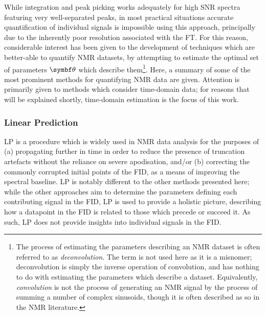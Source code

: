 While integration and peak picking works adequately for high \ac{SNR} spectra
featuring very well-separated peaks, in most practical situations accurate
quantification of individual signals is impossible using this approach,
principally due to the inherently poor resolution associated with the
\ac{FT}.
For this reason, considerable interest has been given to the development of
techniques which are better-able to quantify \ac{NMR} datasets, by attempting
to estimate the optimal set of parameters $\bth$ which describe them\footnote{
    The process of estimating the parameters describing an \ac{NMR}
    dataset is often referred to as \emph{deconvolution}. The term is not used
    here as it is a misnomer; deconvolution is simply the inverse operation of
    convolution, and has nothing to do with estimating the parameters which
    describe a dataset. Equivalently, \emph{convolution} is not the process of
    generating an \ac{NMR} signal by the process of summing a number of complex
    sinusoids, though it is often described as so in the \ac{NMR} literature.
}.
Here, a summary of some of the most prominent methods for quantifying \ac{NMR}
data are given. Attention is primarily given to methods which consider
time-domain data; for reasons that will be explained shortly, time-domain
estimation is the focus of this work.

\subsubsection{Linear Prediction}
\Ac{LP}\cite{Stephenson1988,Koehl1999,Marion1989b,Zhu1992} is a procedure which
is widely used in \ac{NMR} data analysis for the purposes of (a) propagating
 further in time in order to reduce the presence of truncation
artefacts without the reliance on severe apodisation, and/or (b) correcting the
commonly corrupted initial points of the \ac{FID}, as a means of improving the
spectral baseline. \ac{LP} is notably different to the other methods presented
here; while the other approaches aim to determine the parameters defining each
contributing signal in the \ac{FID}, \ac{LP} is used to provide a holistic
picture, describing how a datapoint in the \ac{FID} is related to those
which precede or succeed it.  As such, \ac{LP} does not provide insights into
individual signals in the \ac{FID}.

